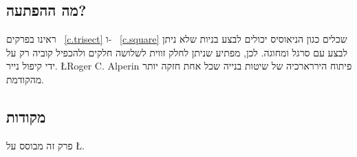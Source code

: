 \subsection*{מה ההפתעה?}

ראינו בפרקים%
~\ref{c.trisect}
ו-%
~\ref{c.square}
שכלים כגון הניאוסיס יכולים לבצע בניות שלא ניתן לבצע עם סרגל ומחוגה. לכן, מפתיע שניתן לחלק זווית לשלושה חלקים ולהכפיל קוביה רק על ידי קיפול נייר.
\L{Roger C. Alperin}
פיתוח היררארכיה של שיטות בנייה שכל אחת חזקה יותר מהקודמת.

\subsection*{מקודות}

פרק זה מבוסס על
\L{\cite{alperin,lang,martin,newton}}.
